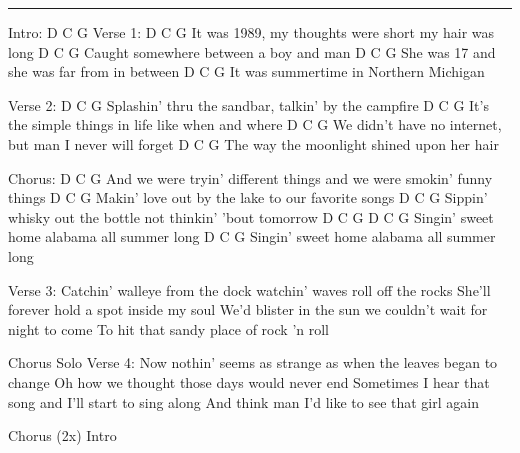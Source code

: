 \noindent\rule{\columnwidth}{1pt}

\begin{lstsong}
Intro: D  C  G
Verse 1:
       D  C                   G
It was 1989, my thoughts were short my hair was long
D                  C               G
Caught somewhere between a boy and man
D        C             G
She was 17 and she was far from in between
       D             C        G
It was summertime in Northern Michigan

Verse 2:
   D               C         G    
Splashin' thru the sandbar, talkin' by the campfire
          D                C                  G 
It's the simple things in life like when and where
    D             C             G
We didn't have no internet, but man I never will forget
    D                 C               G
The way the moonlight shined upon her hair

Chorus:
            D                C                  G
And we were tryin' different things and we were smokin' funny things
       D               C                    G
Makin' love out by the lake to our favorite songs
        D              C          G
Sippin' whisky out the bottle not thinkin' 'bout tomorrow
        D             C        G            D  C  G
Singin' sweet home alabama all summer long
        D             C        G
Singin' sweet home alabama all summer long

Verse 3:
Catchin' walleye from the dock watchin' waves roll off the rocks
She'll forever hold a spot inside my soul
We'd blister in the sun we couldn't wait for night to come
To hit that sandy place of rock 'n roll

Chorus
Solo
Verse 4:
Now nothin' seems as strange as when the leaves began to change
Oh how we thought those days would never end
Sometimes I hear that song and I'll start to sing along
And think man I'd like to see that girl again

Chorus (2x)
Intro
\end{lstsong}

\begin{comment}
\begin{lsttab}
Intro / Riffs (Sweet Home Alabama):
                pm                 pm          po     po     po 
|-------------------------------|-------------------------------|
|--------3---------------3------|-------------------------------|
|----------2---------------0----|--------0--0----------------2/0|
|--0--0------0---------------0--|-------------------0-2/0-------|
|--------------3(0)3------------|--------------0/2--------2-----|
|-------------------------------|-3(0)3-------------------------|
\end{lsttab}
\end{comment}

